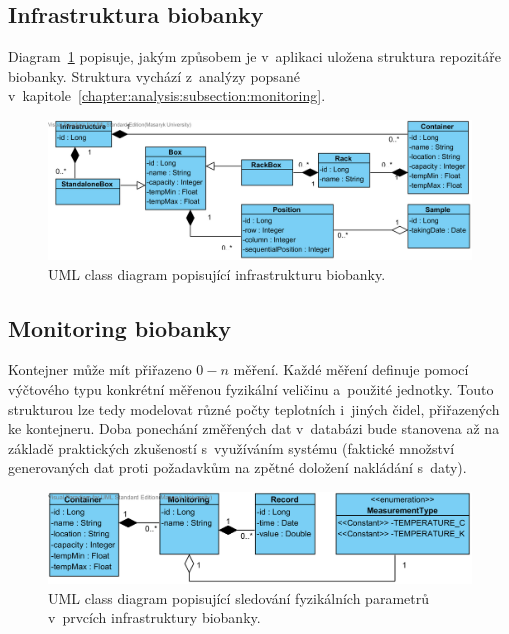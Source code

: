 \documentclass[11pt, final, oneside]{fithesis2}
\begin{document}
\subsection{Infrastruktura biobanky}
Diagram~\ref{fig:index:uml:class:infrastructure} popisuje, jakým způsobem je v~aplikaci uložena struktura repozitáře biobanky. Struktura vychází z~analýzy popsané v~kapitole~\ref{chapter:analysis:subsection:monitoring}.

\begin{figure}[h!]
\centering
	\includegraphics[width=\textwidth]{InfrastructureView}
\caption{UML class diagram popisující infrastrukturu biobanky.}
\label{fig:index:uml:class:infrastructure}
\end{figure}

\subsection{Monitoring biobanky}
Kontejner může mít přiřazeno $0-n$ měření. Každé měření definuje pomocí výčtového typu konkrétní měřenou fyzikální veličinu a~použité jednotky. Touto strukturou lze tedy modelovat různé počty teplotních i~jiných čidel, přiřazených ke kontejneru. 
Doba ponechání změřených dat v~databázi bude stanovena až na základě praktických zkušeností s~využíváním systému (faktické množství generovaných dat proti požadavkům na zpětné doložení nakládání s~daty).

\begin{figure}[h!]
\centering
	\includegraphics[width=\textwidth]{MonitoringView}
\caption{UML class diagram popisující sledování fyzikálních parametrů v~prvcích infrastruktury biobanky.}
\label{fig:index:uml:class:monitoring}
\end{figure}
\end{document}
